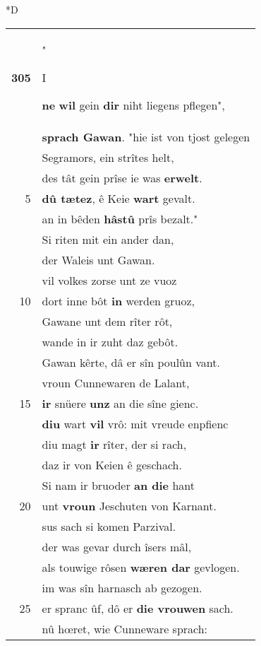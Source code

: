 \documentclass[8pt,a4paper,notitlepage]{article}
\begin{document}
\begin{table}[ht]
\begin{minipage}[t]{0.5\linewidth}
\small
\begin{center}*D
\end{center}
\begin{tabular}{rl}
\textbf{305} & "\begin{large}I\end{large}\textbf{ne} \textbf{wil} gein \textbf{dir} niht liegens pflegen",\\ 
 & \textbf{sprach Gawan}. "hie ist von tjost gelegen\\ 
 & Segramors, ein strîtes helt,\\ 
 & des tât gein prîse ie was \textbf{erwelt}.\\ 
5 & \textbf{dû tætez}, ê Keie \textbf{wart} gevalt.\\ 
 & an in bêden \textbf{hâstû} prîs bezalt."\\ 
 & Si riten mit ein ander dan,\\ 
 & der Waleis unt Gawan.\\ 
 & vil volkes zorse unt ze vuoz\\ 
10 & dort inne bôt \textbf{in} werden gruoz,\\ 
 & Gawane unt dem rîter rôt,\\ 
 & wande in ir zuht daz gebôt.\\ 
 & Gawan kêrte, dâ er sîn poulûn vant.\\ 
 & vroun Cunnewaren de Lalant,\\ 
15 & \textbf{ir} snüere \textbf{unz} an die sîne gienc.\\ 
 & \textbf{diu} wart \textbf{vil} vrô: mit vreude enpfienc\\ 
 & diu magt \textbf{ir} rîter, der si rach,\\ 
 & daz ir von Keien ê geschach.\\ 
 & Si nam ir bruoder \textbf{an die} hant\\ 
20 & unt \textbf{vroun} Jeschuten von Karnant.\\ 
 & sus sach si komen Parzival.\\ 
 & der was gevar durch îsers mâl,\\ 
 & als touwige rôsen \textbf{wæren dar} gevlogen.\\ 
 & im was sîn harnasch ab gezogen.\\ 
25 & er spranc ûf, dô er \textbf{die vrouwen} sach.\\ 
 & nû hœret, wie Cunneware sprach:\\ 

\end{tabular}
\end{minipage}
\end{table}
\end{document}
